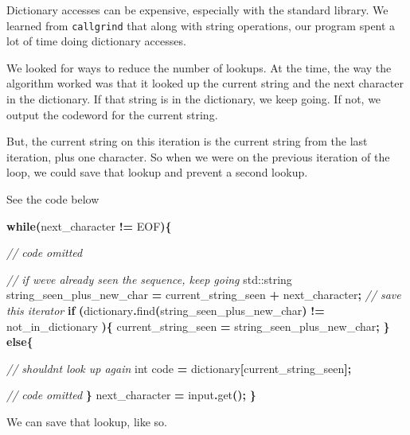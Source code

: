 \documentclass[12pt,twoside]{reedthesis}
\newenvironment{Shaded}{\begin{snugshade}}{\end{snugshade}}
\newcommand{\BuiltInTok}[1]{#1}
\newcommand{\CommentTok}[1]{\textcolor[rgb]{0.56,0.35,0.01}{\textit{#1}}}
\newcommand{\ControlFlowTok}[1]{\textcolor[rgb]{0.13,0.29,0.53}{\textbf{#1}}}
\newcommand{\DataTypeTok}[1]{\textcolor[rgb]{0.13,0.29,0.53}{#1}}
\newcommand{\NormalTok}[1]{#1}
\newcommand{\OperatorTok}[1]{\textcolor[rgb]{0.81,0.36,0.00}{\textbf{#1}}}
\begin{document}
Dictionary accesses can be expensive, especially with the standard library. We learned from \texttt{callgrind} that along with string operations, our program spent a lot of time doing dictionary accesses.

We looked for ways to reduce the number of lookups. At the time, the way the algorithm worked was that it looked up the current string and the next character in the dictionary. If that string is in the dictionary, we keep going. If not, we output the codeword for the current string.

But, the current string on this iteration is the current string from the last iteration, plus one character. So when we were on the previous iteration of the loop, we could save that lookup and prevent a second lookup.

See the code below
\begin{Shaded}
\begin{Highlighting}[]
\ControlFlowTok{while}\OperatorTok{(}\NormalTok{next\_character }\OperatorTok{!=}\NormalTok{ EOF}\OperatorTok{)\{}

    \CommentTok{// code omitted}


    \CommentTok{// if we\textquotesingle{}ve already seen the sequence, keep going}
    \BuiltInTok{std::}\NormalTok{string}\OperatorTok{ }\NormalTok{string\_seen\_plus\_new\_char }\OperatorTok{=}\NormalTok{ current\_string\_seen }\OperatorTok{+}\NormalTok{ next\_character}\OperatorTok{;}
    \CommentTok{// save this iterator\textasciigrave{}}
    \ControlFlowTok{if} \OperatorTok{(}\NormalTok{dictionary}\OperatorTok{.}\NormalTok{find}\OperatorTok{(}\NormalTok{string\_seen\_plus\_new\_char}\OperatorTok{)} \OperatorTok{!=}\NormalTok{ not\_in\_dictionary }\OperatorTok{)\{}
\NormalTok{        current\_string\_seen }\OperatorTok{=}\NormalTok{ string\_seen\_plus\_new\_char}\OperatorTok{;}
    \OperatorTok{\}}
    \ControlFlowTok{else}\OperatorTok{\{}

        \CommentTok{// shouldn\textquotesingle{}t look up again}
        \DataTypeTok{int}\NormalTok{ code }\OperatorTok{=}\NormalTok{ dictionary}\OperatorTok{[}\NormalTok{current\_string\_seen}\OperatorTok{];}


        \CommentTok{// code omitted}
    \OperatorTok{\}}
\NormalTok{    next\_character }\OperatorTok{=}\NormalTok{ input}\OperatorTok{.}\NormalTok{get}\OperatorTok{();}
\OperatorTok{\}}
\end{Highlighting}
\end{Shaded}
We can save that lookup, like so.
\end{document}
